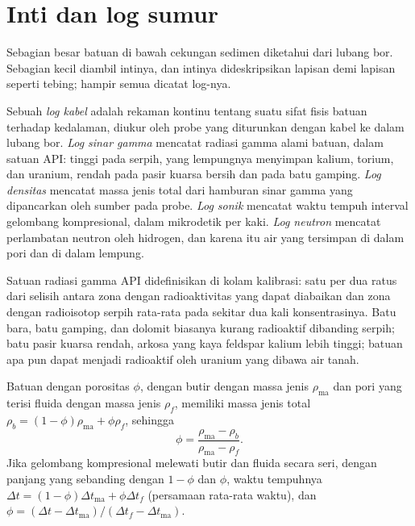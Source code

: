 \section{Inti dan log sumur}\label{sec:b3:facies-models:logs}

Sebagian besar batuan di bawah cekungan sedimen diketahui dari lubang bor. Sebagian kecil
diambil intinya, dan intinya dideskripsikan lapisan demi lapisan seperti tebing; hampir semua
dicatat log-nya.

\begin{definition}\label{def:b3:facies-models:wireline}
Sebuah \emph{log kabel} adalah rekaman kontinu tentang
suatu sifat fisis batuan terhadap kedalaman, diukur oleh probe yang diturunkan
dengan kabel ke dalam lubang bor. \emph{Log sinar gamma}
mencatat radiasi gamma alami batuan, dalam satuan API: tinggi pada
serpih, yang lempungnya menyimpan kalium, torium, dan uranium, rendah pada pasir kuarsa bersih
dan pada batu gamping. \emph{Log densitas}
mencatat massa jenis total dari hamburan sinar gamma yang dipancarkan oleh
sumber pada probe. \emph{Log sonik} mencatat
waktu tempuh interval gelombang kompresional, dalam mikrodetik per kaki.
\emph{Log neutron} mencatat perlambatan neutron oleh hidrogen,
dan karena itu air yang tersimpan di dalam pori dan di dalam lempung.
\end{definition}

Satuan radiasi gamma API didefinisikan di kolam kalibrasi: satu per dua ratus dari
selisih antara zona dengan radioaktivitas yang dapat diabaikan dan zona dengan
radioisotop serpih rata-rata pada sekitar dua kali konsentrasinya. Batu bara,
batu gamping, dan dolomit biasanya kurang radioaktif dibanding serpih; batu pasir
kuarsa rendah, arkosa yang kaya feldspar kalium lebih tinggi; batuan apa pun dapat
menjadi radioaktif oleh uranium yang dibawa air tanah.

\begin{proposition}\label{prop:b3:facies-models:porosity}
Batuan dengan porositas $\phi$, dengan butir dengan massa jenis $\rho_{\mathrm{ma}}$ dan
pori yang terisi fluida dengan massa jenis $\rho_f$, memiliki massa jenis total
$\rho_b = (1 - \phi)\rho_{\mathrm{ma}} + \phi\rho_f$, sehingga
\[
\phi = \frac{\rho_{\mathrm{ma}} - \rho_b}{\rho_{\mathrm{ma}} - \rho_f}.
\]
Jika gelombang kompresional melewati butir dan fluida secara seri, dengan
panjang yang sebanding dengan $1 - \phi$ dan $\phi$, waktu tempuhnya
$\Delta t = (1 - \phi)\Delta t_{\mathrm{ma}} + \phi\Delta t_f$ (persamaan
rata-rata waktu), dan $\phi = (\Delta t - \Delta
t_{\mathrm{ma}})/(\Delta t_f - \Delta t_{\mathrm{ma}})$.
\end{proposition}

